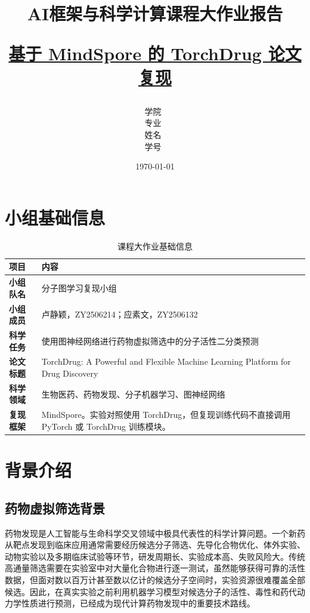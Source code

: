 \documentclass[12pt,hyperref,a4paper,UTF8]{ctexart}
\title{ 
        \vspace{1.5cm}
        \heiti \Huge \textbf{{AI框架与科学计算课程大作业报告}} \par
        \vspace{1cm} 
        \heiti \Large {\underline{基于 MindSpore 的 TorchDrug 论文复现}}
        \vspace{1cm}
    }
\author{
        \vspace{0.7cm}
        \kaishu\Large 学院\ \dlmu[9cm]{计算机学院} \\ %
        \vspace{0.7cm}
        \kaishu\Large 专业\ \dlmu[9cm]{计算机技术} \\ %
        \vspace{0.7cm}
        \kaishu\Large 姓名\ \dlmu[9cm]{卢静颖、应素文} \\ %
        \vspace{0.7cm}
        \kaishu\Large 学号\ \dlmu[9cm]{ZY2506214、ZY2506132} \qquad \\ %
    }
\date{\today} %
\begin{document}
\cover
\thispagestyle{empty}

\newpage
\tableofcontents
\thispagestyle{empty}

\newpage
\setcounter{page}{1}
\pagestyle{mainstyle}
\thispagestyle{mainstyle}

\section{小组基础信息}

\begin{table}[H]
  \centering
  \caption{课程大作业基础信息}
  \begin{tabular}{@{}>{\bfseries}p{}p{}@{}}
    \toprule
    项目 & 内容\\
    \midrule
    小组队名 & 分子图学习复现小组\\
    小组成员 & 卢静颖，ZY2506214；应素文，ZY2506132\\
    科学任务 & 使用图神经网络进行药物虚拟筛选中的分子活性二分类预测\\
    论文标题 & TorchDrug: A Powerful and Flexible Machine Learning Platform for Drug Discovery\\
    科学领域 & 生物医药、药物发现、分子机器学习、图神经网络\\
    复现框架 & MindSpore。实验对照使用 TorchDrug，但复现训练代码不直接调用 PyTorch 或 TorchDrug 训练模块。\\
    \bottomrule
  \end{tabular}
\end{table}

\section{背景介绍}

\subsection{药物虚拟筛选背景}

药物发现是人工智能与生命科学交叉领域中极具代表性的科学计算问题。一个新药从靶点发现到临床应用通常需要经历候选分子筛选、先导化合物优化、体外实验、动物实验以及多期临床试验等环节，研发周期长、实验成本高、失败风险大。传统高通量筛选需要在实验室中对大量化合物进行逐一测试，虽然能够获得可靠的活性数据，但面对数以百万计甚至数以亿计的候选分子空间时，实验资源很难覆盖全部候选。因此，在真实实验之前利用机器学习模型对候选分子的活性、毒性和药代动力学性质进行预测，已经成为现代计算药物发现中的重要技术路线。
\end{document}
